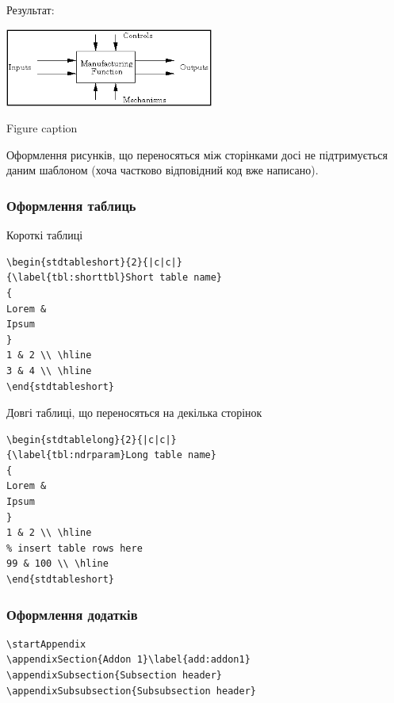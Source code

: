Результат:

\begin{stdfigure}
\includegraphics[width=2.7in]{images/idef_fb.png}
\caption{Figure caption}
\label{fig:idef_fb}
\end{stdfigure}

Оформлення рисунків, що переносяться між сторінками досі не підтримується даним
шаблоном (хоча частково відповідний код вже написано).

\subsubsection{Оформлення таблиць}

Короткі таблиці

\begin{framed}\small
\begin{lstlisting}
\begin{stdtableshort}{2}{|c|c|}
{\label{tbl:shorttbl}Short table name}
{
Lorem &
Ipsum
}
1 & 2 \\ \hline
3 & 4 \\ \hline
\end{stdtableshort}
\end{lstlisting}
\end{framed}

Довгі таблиці, що переносяться на декілька сторінок

\begin{framed}\small
\begin{lstlisting}
\begin{stdtablelong}{2}{|c|c|}
{\label{tbl:ndrparam}Long table name}
{
Lorem &
Ipsum
}
1 & 2 \\ \hline
% insert table rows here 
99 & 100 \\ \hline
\end{stdtableshort}
\end{lstlisting}
\end{framed}

\subsubsection{Оформлення додатків}

\begin{framed}
\begin{lstlisting}
\startAppendix
\appendixSection{Addon 1}\label{add:addon1} 
\appendixSubsection{Subsection header}
\appendixSubsubsection{Subsubsection header}
\end{lstlisting}
\end{framed}

